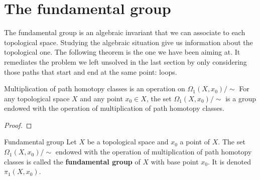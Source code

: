 \section{The fundamental group}

The fundamental group is  an algebraic invariant that we can  associate to each  topological space. Studying the algebraic situation give us information about the topological one.   The following theorem is the one we have been aiming at. It remediates the problem we left unsolved in the last section by only considering those paths that start and end at the same point: loops. 










\begin{theorem}{Multiplication of path homotopy classes is an operation on \(\Omega_1(X,x_0)  / \!\!\sim\)}{}
    For any topological space \(X\) and any point \(x_0\in X\), the set \(\Omega_1(X,x_0)  / \!\!\sim\) is a group endowed with the operation  of  multiplication of path homotopy classes.
\end{theorem}

\begin{proof}
    
\end{proof}

\begin{definition}{Fundamental group}{}
    Let \(X\) be a topological space and \(x_0\)   a point of \(X\).
    The set \(\Omega_1(X,x_0)  / \!\!\sim\) endowed with the operation  of multiplication of path homotopy classes is called the \textbf{fundamental group} of \(X\) with base point  \(x_0\). It is denoted \(\pi_1(X,x_0)\).
\end{definition}


 


